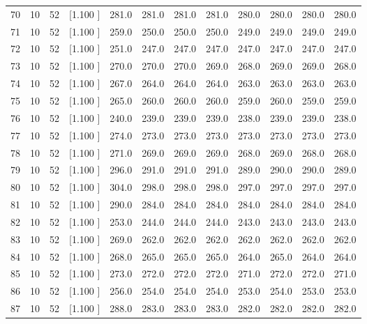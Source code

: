 \documentclass[12pt,a4paper]{article}
\begin{document}
\begin{center}
{\begin{tabular}{r r r r r r r r r r r r}
  70& 10& 52&[1.100     ]&   281.0&   281.0&   281.0&   281.0&   280.0&   280.0&   280.0&   280.0\\[-0.02in]
  71& 10& 52&[1.100     ]&   259.0&   250.0&   250.0&   250.0&   249.0&   249.0&   249.0&   249.0\\[-0.02in]
  72& 10& 52&[1.100     ]&   251.0&   247.0&   247.0&   247.0&   247.0&   247.0&   247.0&   247.0\\[-0.02in]
  73& 10& 52&[1.100     ]&   270.0&   270.0&   270.0&   269.0&   268.0&   269.0&   269.0&   268.0\\[-0.02in]
  74& 10& 52&[1.100     ]&   267.0&   264.0&   264.0&   264.0&   263.0&   263.0&   263.0&   263.0\\[-0.02in]
  75& 10& 52&[1.100     ]&   265.0&   260.0&   260.0&   260.0&   259.0&   260.0&   259.0&   259.0\\[-0.02in]
  76& 10& 52&[1.100     ]&   240.0&   239.0&   239.0&   239.0&   238.0&   239.0&   239.0&   238.0\\[-0.02in]
  77& 10& 52&[1.100     ]&   274.0&   273.0&   273.0&   273.0&   273.0&   273.0&   273.0&   273.0\\[-0.02in]
  78& 10& 52&[1.100     ]&   271.0&   269.0&   269.0&   269.0&   268.0&   269.0&   268.0&   268.0\\[-0.02in]
  79& 10& 52&[1.100     ]&   296.0&   291.0&   291.0&   291.0&   289.0&   290.0&   290.0&   289.0\\[-0.02in]
  80& 10& 52&[1.100     ]&   304.0&   298.0&   298.0&   298.0&   297.0&   297.0&   297.0&   297.0\\[-0.02in]
  81& 10& 52&[1.100     ]&   290.0&   284.0&   284.0&   284.0&   284.0&   284.0&   284.0&   284.0\\[-0.02in]
  82& 10& 52&[1.100     ]&   253.0&   244.0&   244.0&   244.0&   243.0&   243.0&   243.0&   243.0\\[-0.02in]
  83& 10& 52&[1.100     ]&   269.0&   262.0&   262.0&   262.0&   262.0&   262.0&   262.0&   262.0\\[-0.02in]
  84& 10& 52&[1.100     ]&   268.0&   265.0&   265.0&   265.0&   264.0&   265.0&   264.0&   264.0\\[-0.02in]
  85& 10& 52&[1.100     ]&   273.0&   272.0&   272.0&   272.0&   271.0&   272.0&   272.0&   271.0\\[-0.02in]
  86& 10& 52&[1.100     ]&   256.0&   254.0&   254.0&   254.0&   253.0&   254.0&   253.0&   253.0\\[-0.02in]
  87& 10& 52&[1.100     ]&   288.0&   283.0&   283.0&   283.0&   282.0&   282.0&   282.0&   282.0\\[-0.02in]

\end{tabular}}
\end{center}
\end{document}
